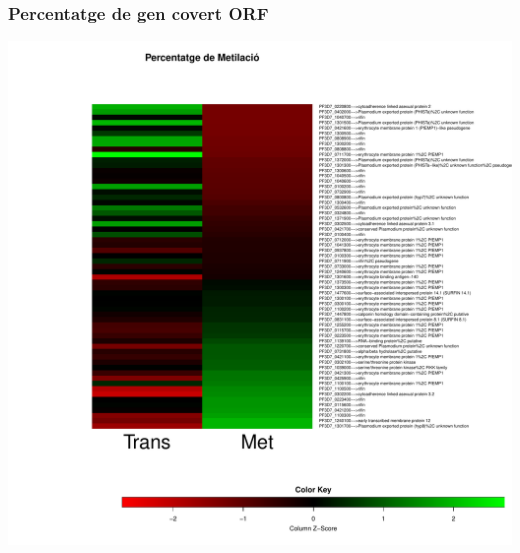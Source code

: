 \documentclass{article}\usepackage[]{graphicx}\usepackage[]{color}
\newenvironment{knitrout}{}{} %
\begin{document}
\subsubsection{Percentatge de gen covert ORF}
\begin{knitrout}
\color{fgcolor}

{\centering \includegraphics[width=.9\linewidth]{figure/minimal-met_percent_ORF-1} 

}



\end{knitrout}
\clearpage
\end{document}
